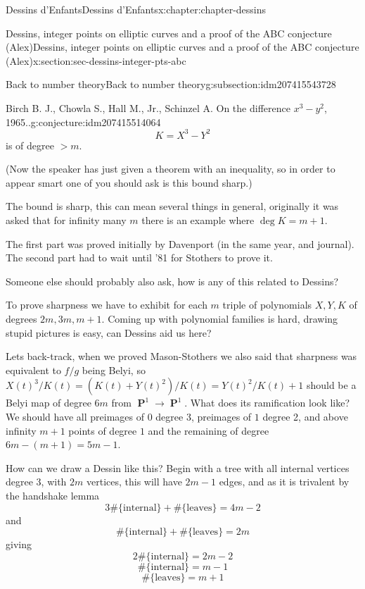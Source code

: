\documentclass[oneside,10pt,]{book}
\numberwithin{equation}{section}
\DeclareMathOperator{\PP}{\mathbf{P}}
\newcommand{\gt}{>}
\begin{document}
\begin{chapterptx}{Dessins d'Enfants}{}{Dessins d'Enfants}{}{}{x:chapter:chapter-dessins}
\begin{sectionptx}{Dessins, integer points on elliptic curves and a proof of the ABC conjecture (Alex)}{}{Dessins, integer points on elliptic curves and a proof of the ABC conjecture (Alex)}{}{}{x:section:sec-dessins-integer-pts-abc}
\begin{subsectionptx}{Back to number theory}{}{Back to number theory}{}{}{g:subsection:idm207415543728}
\begin{conjecture}{Birch B. J., Chowla S., Hall M., Jr., Schinzel A. On the difference \(x^3 - y^2\), 1965..}{}{g:conjecture:idm207415514064}
\begin{equation*}
K = X^3 - Y^2
\end{equation*}
is of degree \(\gt m\).%
\par
(Now the speaker has just given a theorem with an inequality, so in order to appear smart one of you should ask is this bound sharp.)%
\par
The bound is sharp, this can mean several things in general, originally it was asked that for infinity many \(m\) there is an example where \(\deg K = m + 1\).%
\end{conjecture}
The first part was proved initially by Davenport (in the same year, and journal). The second part had to wait until '81 for Stothers to prove it.%
\par
Someone else should probably also ask, how is any of this related to Dessins?%
\par
To prove sharpness we have to exhibit for each \(m\) triple of polynomials \(X,Y,K\) of degrees \(2m,3m,m+1\). Coming up with polynomial families is hard, drawing stupid pictures is easy, can Dessins aid us here?%
\par
Lets back-track, when we proved Mason-Stothers we also said that sharpness was equivalent to \(f/g\) being Belyi, so \(X(t)^3/K(t) = (K(t) + Y(t)^2) / K(t) = Y(t)^2/K(t) + 1\) should be a Belyi map of degree \(6m\) from \(\PP^1\to \PP^1\). What does its ramification look like? We should have all preimages of \(0\) degree 3, preimages of \(1\) degree 2, and above infinity \(m + 1\) points of degree \(1\) and the remaining of degree \(6m - (m + 1) = 5m - 1\).%
\par
How can we draw a Dessin like this? Begin with a tree with all internal vertices degree 3, with \(2m\) vertices, this will have \(2m - 1\) edges, and as it is trivalent by the handshake lemma%
\begin{equation*}
3 \#\{\text{internal}\} + \#\{\text{leaves}\} =  4m - 2
\end{equation*}
and%
\begin{equation*}
\#\{\text{internal}\} + \#\{\text{leaves}\} =  2m
\end{equation*}
giving%
\begin{equation*}
2\#\{\text{internal}\} =  2m - 2
\end{equation*}
%
\begin{equation*}
\#\{\text{internal}\} =  m - 1
\end{equation*}
%
\begin{equation*}
\#\{\text{leaves}\} =  m + 1

\end{equation*}
\end{subsectionptx}
\end{sectionptx}
\end{chapterptx}
\end{document}
